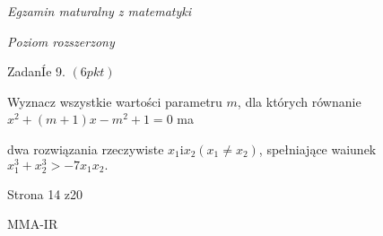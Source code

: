 \documentclass[a4paper,12pt]{article}
\begin{document}
{\it Egzamin maturalny z matematyki}

{\it Poziom rozszerzony}

ZadanÍe 9. $(6pkt)$

Wyznacz wszystkie wartości parametru $m$, dla których równanie $x^{2}+(m+1)x-m^{2}+1=0$ ma

dwa rozwiązania rzeczywiste $x_{1} \mathrm{i}x_{2}(x_{1}\neq x_{2})$, spełniające waiunek $x_{1}^{3}+x_{2}^{3}>-7x_{1}x_{2}.$

Strona 14 z20

MMA-IR
\end{document}
